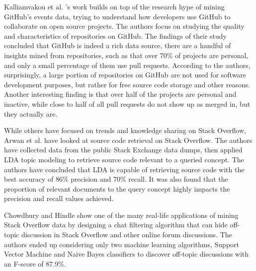         Kalliamvakou et al. \cite{kalliamvakou2014promises}'s work builds on top of the research hype of mining GitHub's events data, trying to understand how developers use GitHub to collaborate on open source projects. The authors focus on studying the quality and characteristics of repositories on GitHub. The findings of their study concluded that GitHub is indeed a rich data source, there are a handful of insights mined from repositories, such as that over 70\% of projects are personal, and only a small percentage of them use pull requests. According to the authors, surprisingly, a large portion of repositories on GitHub are not used for software development purposes, but rather for free source code storage and other reasons. Another interesting finding is that over half of the projects are personal and inactive, while close to half of all pull requests do not show up as merged in, but they actually are.
        
        While others have focused on trends and knowledge sharing on Stack Overflow, Arwan et al. \cite{arwan2015source} have looked at source code retrieval on Stack Overflow. The authors have collected data from the public Stack Exchange data dumps, then applied LDA topic modeling to retrieve source code relevant to a queried concept. The authors have concluded that LDA is capable of retrieving source code with the best accuracy of 86\% precision and 70\% recall. It was also found that the proportion of relevant documents to the query concept highly impacts the precision and recall values achieved.
        
        Chowdhury and Hindle \cite{chowdhury2015mining} show one of the many real-life applications of mining Stack Overflow data by designing a chat filtering algorithm that can hide off-topic discussion in Stack Overflow and other online forum discussions. The authors ended up considering only two machine learning algorithms, Support Vector Machine and Naive Bayes classifiers to discover off-topic discussions with an F-score of 87.9\%.
        
